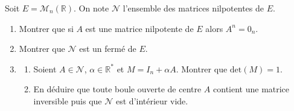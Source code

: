 \documentclass[a4paper,10pt]{report}
\begin{document}
\begin{Exa}[\ding{80}] Soit $E= \mathcal{M}_n(\mathbb{R})$. On note $\mathcal{N}$ l'ensemble des matrices nilpotentes de $E$.

\begin{enumerate}
\item Montrer que si $A$ est une matrice nilpotente de $E$ alors $A^n=0_n$.
\item Montrer que $\mathcal{N}$ est un fermé de $E$.
\item 
\begin{enumerate}
\item Soient $A \in \mathcal{N}$, $\alpha \in \mathbb{R}^*$ et $M=I_n+ \alpha A$. Montrer que $\textrm{det}(M)=1$.
\item En déduire que toute boule ouverte de centre $A$ contient une matrice inversible puis que $\mathcal{N}$ est d'intérieur vide.
\end{enumerate}
\end{enumerate}
\end{Exa}

\corr 
\end{document}
